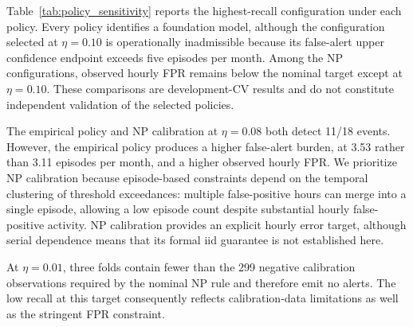 \documentclass[a4paper,fleqn]{cas-sc}
\begin{document}
Table~\ref{tab:policy_sensitivity} reports the highest-recall
configuration under each policy. Every policy identifies a
foundation model, although the configuration selected at
$\eta=0.10$ is operationally inadmissible because its
false-alert upper confidence endpoint exceeds five episodes
per month. Among the NP configurations, observed hourly FPR
remains below the nominal target except at $\eta=0.10$.
These comparisons are development-CV results and do not
constitute independent validation of the selected policies.

The empirical policy and NP calibration at $\eta=0.08$
both detect 11/18 events. However, the empirical policy
produces a higher false-alert burden, at 3.53 rather than
3.11 episodes per month, and a higher observed hourly FPR.
We prioritize NP calibration because episode-based
constraints depend on the temporal clustering of threshold
exceedances: multiple false-positive hours can merge into
a single episode, allowing a low episode count despite
substantial hourly false-positive activity. NP calibration
provides an explicit hourly error target, although serial
dependence means that its formal iid guarantee is not
established here.

At $\eta=0.01$, three folds contain fewer than the 299
negative calibration observations required by the nominal
NP rule and therefore emit no alerts. The low recall at
this target consequently reflects calibration-data
limitations as well as the stringent FPR constraint.
\end{document}
